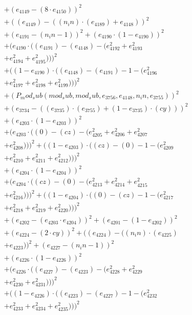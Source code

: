 \documentclass[10pt, a4paper]{article}
\begin{document}
\begin{align*}
& + (e_{4149} - (8  \cdot  e_{4150}))^{2} \\
& + ((e_{4149}) - ((n_in)  \cdot  (e_{4189}) + e_{4148}))^{2} \\
& + (e_{4191} - (n_in - 1))^{2} + (e_{4190}  \cdot  (1 - e_{4190}))^{2} \\
& + (e_{4190}  \cdot  ((e_{4191}) - (e_{4148}) - (e_{4192}^{2} + e_{4193}^{2} \\
& + e_{4194}^{2} + e_{4195}^{2})))^{2} \\
& + ((1 - e_{4190})  \cdot  ((e_{4148}) - (e_{4191}) - 1 - (e_{4196}^{2} \\
& + e_{4197}^{2} + e_{4198}^{2} + e_{4199}^{2})))^{2} \\
& + (P_mod_sub(mod_sub, mod_sub, e_{3756}, e_{4148}, n_in, e_{3755}))^{2} \\
& + (e_{3734} - ((e_{3735})  \cdot  (e_{3755}) + (1 - e_{3735})  \cdot  (cy)))^{2} \\
& + (e_{4203}  \cdot  (1 - e_{4203}))^{2} \\
& + (e_{4203}  \cdot  ((0) - (cz) - (e_{4205}^{2} + e_{4206}^{2} + e_{4207}^{2} \\
& + e_{4208}^{2})))^{2} + ((1 - e_{4203})  \cdot  ((cz) - (0) - 1 - (e_{4209}^{2} \\
& + e_{4210}^{2} + e_{4211}^{2} + e_{4212}^{2})))^{2} \\
& + (e_{4204}  \cdot  (1 - e_{4204}))^{2} \\
& + (e_{4204}  \cdot  ((cz) - (0) - (e_{4213}^{2} + e_{4214}^{2} + e_{4215}^{2} \\
& + e_{4216}^{2})))^{2} + ((1 - e_{4204})  \cdot  ((0) - (cz) - 1 - (e_{4217}^{2} \\
& + e_{4218}^{2} + e_{4219}^{2} + e_{4220}^{2})))^{2} \\
& + (e_{4202} - (e_{4203}  \cdot  e_{4204}))^{2} + (e_{4201} - (1 - e_{4202}))^{2} \\
& + (e_{4224} - (2  \cdot  cy))^{2} + ((e_{4224}) - ((n_in)  \cdot  (e_{4225}) \\
& + e_{4223}))^{2} + (e_{4227} - (n_in - 1))^{2} \\
& + (e_{4226}  \cdot  (1 - e_{4226}))^{2} \\
& + (e_{4226}  \cdot  ((e_{4227}) - (e_{4223}) - (e_{4228}^{2} + e_{4229}^{2} \\
& + e_{4230}^{2} + e_{4231}^{2})))^{2} \\
& + ((1 - e_{4226})  \cdot  ((e_{4223}) - (e_{4227}) - 1 - (e_{4232}^{2} \\
& + e_{4233}^{2} + e_{4234}^{2} + e_{4235}^{2})))^{2} \\

\end{align*}
\end{document}
